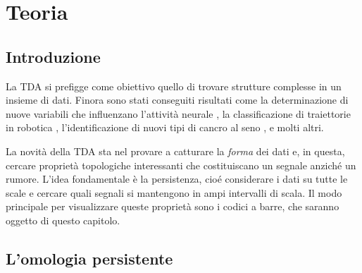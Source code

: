 \chapter{Teoria}\label{ch:teoria}
\section{Introduzione}

La TDA si prefigge come obiettivo quello di trovare strutture complesse in un insieme di dati. Finora sono stati conseguiti risultati come la determinazione di nuove variabili che influenzano l'attività neurale \cite{Spreemann2015}, la classificazione di traiettorie in robotica \cite{Pokorny2014}, l'identificazione di nuovi tipi di cancro al seno \cite{Lum2013}, e molti altri.

La novità della TDA sta nel provare a catturare la \emph{forma} dei dati e, in questa, cercare proprietà topologiche interessanti che costituiscano un segnale anziché un rumore. L'idea fondamentale è la persistenza, cioé considerare i dati su tutte le scale e cercare quali segnali si mantengono in ampi intervalli di scala. Il modo principale per visualizzare queste proprietà sono i codici a barre, che saranno oggetto di questo capitolo.

\section{L'omologia persistente}
